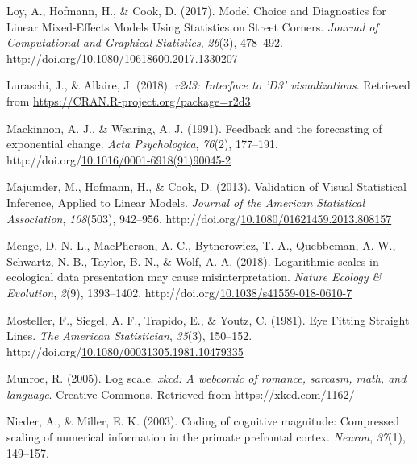\documentclass[print]{nuthesis}
\newlength{\cslhangindent}
\newenvironment{CSLReferences}%
{\setlength{\parindent}{0pt}%
\everypar{\setlength{\hangindent}{\cslhangindent}}\ignorespaces}%
{\par}
\begin{document}
\begin{CSLReferences}{1}{0}
\leavevmode\hypertarget{ref-loy_model_2017}{}%
Loy, A., Hofmann, H., \& Cook, D. (2017). Model {Choice} and {Diagnostics} for {Linear} {Mixed}-{Effects} {Models} {Using} {Statistics} on {Street} {Corners}. \emph{Journal of Computational and Graphical Statistics}, \emph{26}(3), 478--492. http://doi.org/\href{https://doi.org/10.1080/10618600.2017.1330207}{10.1080/10618600.2017.1330207}

\leavevmode\hypertarget{ref-r2d3}{}%
Luraschi, J., \& Allaire, J. (2018). \emph{r2d3: Interface to 'D3' visualizations}. Retrieved from \url{https://CRAN.R-project.org/package=r2d3}

\leavevmode\hypertarget{ref-mackinnon_feedback_1991}{}%
Mackinnon, A. J., \& Wearing, A. J. (1991). Feedback and the forecasting of exponential change. \emph{Acta Psychologica}, \emph{76}(2), 177--191. http://doi.org/\href{https://doi.org/10.1016/0001-6918(91)90045-2}{10.1016/0001-6918(91)90045-2}

\leavevmode\hypertarget{ref-majumder_validation_2013}{}%
Majumder, M., Hofmann, H., \& Cook, D. (2013). Validation of {Visual} {Statistical} {Inference}, {Applied} to {Linear} {Models}. \emph{Journal of the American Statistical Association}, \emph{108}(503), 942--956. http://doi.org/\href{https://doi.org/10.1080/01621459.2013.808157}{10.1080/01621459.2013.808157}

\leavevmode\hypertarget{ref-menge_logarithmic_2018}{}%
Menge, D. N. L., MacPherson, A. C., Bytnerowicz, T. A., Quebbeman, A. W., Schwartz, N. B., Taylor, B. N., \& Wolf, A. A. (2018). Logarithmic scales in ecological data presentation may cause misinterpretation. \emph{Nature Ecology \& Evolution}, \emph{2}(9), 1393--1402. http://doi.org/\href{https://doi.org/10.1038/s41559-018-0610-7}{10.1038/s41559-018-0610-7}

\leavevmode\hypertarget{ref-mosteller_eye_1981}{}%
Mosteller, F., Siegel, A. F., Trapido, E., \& Youtz, C. (1981). Eye {Fitting} {Straight} {Lines}. \emph{The American Statistician}, \emph{35}(3), 150--152. http://doi.org/\href{https://doi.org/10.1080/00031305.1981.10479335}{10.1080/00031305.1981.10479335}

\leavevmode\hypertarget{ref-munroe_2005}{}%
Munroe, R. (2005). Log scale. \emph{xkcd: A webcomic of romance, sarcasm, math, and language}. Creative Commons. Retrieved from \url{https://xkcd.com/1162/}

\leavevmode\hypertarget{ref-nieder2003coding}{}%
Nieder, A., \& Miller, E. K. (2003). Coding of cognitive magnitude: Compressed scaling of numerical information in the primate prefrontal cortex. \emph{Neuron}, \emph{37}(1), 149--157.


\end{CSLReferences}
\end{document}
